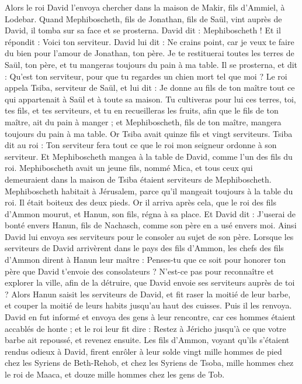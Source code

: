 \begin{multicols}{2}
Alors le roi David l’envoya chercher dans la maison de Makir, fils d’Ammiel, à Lodebar.
Quand Mephiboscheth, fils de Jonathan, fils de Saül, vint auprès de David, il tomba sur sa face et se prosterna. David dit : Mephiboscheth ! Et il répondit : Voici ton serviteur.
David lui dit : Ne crains point, car je veux te faire du bien pour l’amour de Jonathan, ton père. Je te restituerai toutes les terres de Saül, ton père, et tu mangeras toujours du pain à ma table.
Il se prosterna, et dit : Qu’est ton serviteur, pour que tu regardes un chien mort tel que moi ?
Le roi appela Tsiba, serviteur de Saül, et lui dit : Je donne au fils de ton maître tout ce qui appartenait à Saül et à toute sa maison.
Tu cultiveras pour lui ces terres, toi, tes fils, et tes serviteurs, et tu en recueilleras les fruits, afin que le fils de ton maître, ait du pain à manger ; et Mephiboscheth, fils de ton maître, mangera toujours du pain à ma table. Or Tsiba avait quinze fils et vingt serviteurs.
Tsiba dit au roi : Ton serviteur fera tout ce que le roi mon seigneur ordonne à son serviteur. Et Mephiboscheth mangea à la table de David, comme l'un des fils du roi.
Mephiboscheth avait un jeune fils, nommé Mica, et tous ceux qui demeuraient dans la maison de Tsiba étaient serviteurs de Mephiboscheth.
Mephiboscheth habitait à Jérusalem, parce qu'il mangeait toujours à la table du roi. Il était boiteux des deux pieds.
\VerseOne{}Or il arriva après cela, que le roi des fils d’Ammon mourut, et Hanun, son fils, régna à sa place.
Et David dit : J'userai de bonté envers Hanun, fils de Nachasch, comme son père en a usé envers moi. Ainsi David lui envoya ses serviteurs pour le consoler au sujet de son père. Lorsque les serviteurs de David arrivèrent dans le pays des fils d’Ammon,
les chefs des fils d’Ammon dirent à Hanun leur maître : Penses-tu que ce soit pour honorer ton père que David t'envoie des consolateurs ? N'est-ce pas pour reconnaître et explorer la ville, afin de la détruire, que David envoie ses serviteurs auprès de toi ?
Alors Hanun saisit les serviteurs de David, et fit raser la moitié de leur barbe, et couper la moitié de leurs habits jusqu'au haut des cuisses. Puis il les renvoya.
David en fut informé et envoya des gens à leur rencontre, car ces hommes étaient accablés de honte ; et le roi leur fit dire : Restez à Jéricho jusqu'à ce que votre barbe ait repoussé, et revenez ensuite.
Les fils d’Ammon, voyant qu'ils s'étaient rendus odieux à David, firent enrôler à leur solde vingt mille hommes de pied chez les Syriens de Beth-Rehob, et chez les Syriens de Tsoba, mille hommes chez le roi de Maaca, et douze mille hommes chez les gens de Tob.

\end{multicols}
